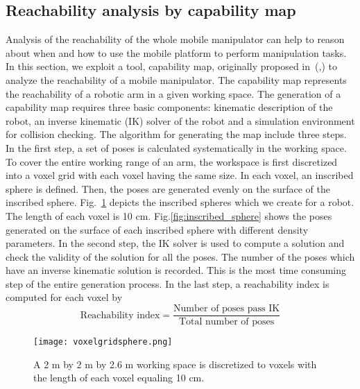 \subsection{Reachability analysis by capability map}
Analysis of the reachability of the whole mobile manipulator can help to reason about when and how to use the mobile platform to perform manipulation tasks. In this section, we exploit a tool, capability map, originally proposed in~(\cite{Zacharias2013},\cite{Zacharias2007}) to analyze the reachability of a mobile manipulator. The capability map represents the reachability of a robotic arm in a given working space. The generation of a capability map requires three basic components: kinematic description of the robot, an inverse kinematic (IK) solver of the robot and a simulation environment for collision checking. The algorithm for generating the map include three steps. In the first step, a set of poses is calculated systematically in the working space. To cover the entire working range of an arm, the workspace is first discretized into a voxel grid with each voxel having the same size. In each voxel, an inscribed sphere is defined. Then, the poses are generated evenly on the surface of the inscribed sphere. Fig.~\ref{fig:voxelgrid_sphere} depicts the inscribed spheres which we create for a robot. The length of each voxel is 10 cm. Fig.\ref{fig:inscribed_sphere} shows the poses generated on the surface of each inscribed sphere with different density parameters.  In the second step, the IK solver is used to compute a solution and check the validity of the solution for all the poses. The number of the poses which have an inverse kinematic solution is recorded. This is the most time consuming step of the entire generation process. In the last step, a reachability index is computed for each voxel by 
\begin{equation}
\text{Reachability index} = \frac{ \text{Number of poses pass IK} }{ \text{Total number of poses} }   
\end{equation}

\begin{figure}[!htbp]
\centering
\texttt{[image: voxelgridsphere.png]}
\captionsetup{justification=raggedright}
\caption{A 2 m by 2 m by 2.6 m working space is discretized to voxels with the length  of each voxel equaling 10 cm. }
\label{fig:voxelgrid_sphere}       %
\end{figure} 


